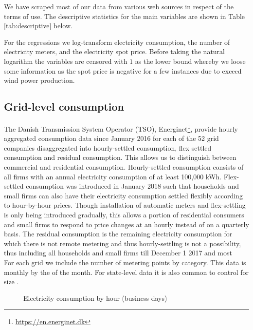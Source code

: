 \label{sec:data}
We have scraped most of our data from various web sources in respect of the terms of use. The descriptive statistics for the main variables are shown in Table \ref{tab:descriptive} below.
\par
For the regressions we log-transform electricity consumption, the number of electricity meters, and the electricity spot price. Before taking the natural logarithm the variables are censored with $1$ as the lower bound whereby we loose some information as the spot price is negative for a few instances due to exceed wind power production.

\subsection{Grid-level consumption}
\label{subsec:d_consumption}
The Danish Transmission System Operator (TSO), Energinet\footnote{\url{https://en.energinet.dk}}, provide hourly aggregated consumption data since January 2016 for each of the 52 grid companies disaggregated into hourly-settled consumption, flex settled consumption and residual consumption. This allows us to distinguish between commercial and residential consumption. Hourly-settled consumption consists of all firms with an annual electricity consumption of at least 100,000 kWh. Flex-settled consumption was introduced in January 2018 such that households and small firms can also have their electricity consumption settled flexibly according to hour-by-hour prices. Though installation of automatic meters and flex-settling is only being introduced gradually, this allows a portion of residential consumers and small firms to respond to price changes at an hourly instead of on a quarterly basis. The residual consumption is the remaining electricity consumption for which there is not remote metering and thus hourly-settling is not a possibility, thus including all households and small firms till December 1 2017 and most
\medskip\\
For each grid we include the number of metering points by category. This data is monthly by the  of the month. For state-level data it is also common to control for size \citep{burke2017price}.
\begin{figure}[H]
  \centering
  \caption{Electricity consumption by hour (business days)}
  \label{fig:cons_hour}
\end{figure}


